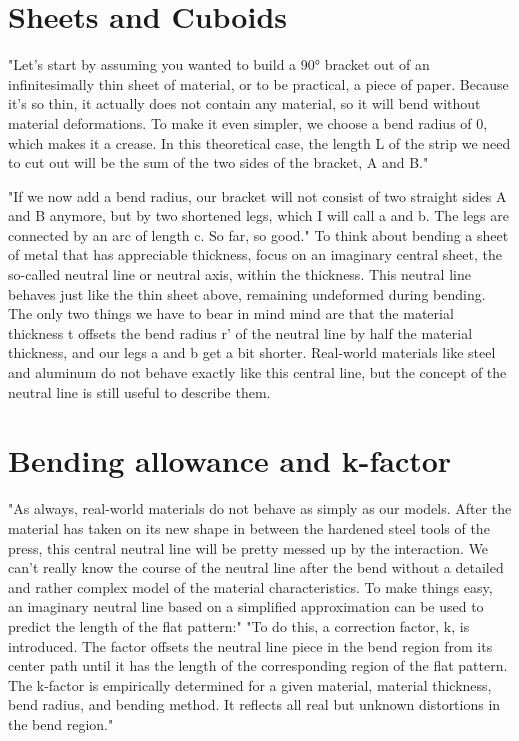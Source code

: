 \section{Sheets and Cuboids}
"Let’s start by assuming you wanted to build a 90° bracket out of an infinitesimally thin sheet of material, or to be practical, a piece of paper. Because it’s so thin, it actually does not contain any material, so it will bend without material deformations. To make it even simpler, we choose a bend radius of 0, which makes it a crease. In this theoretical case, the length L of the strip we need to cut out will be the sum of the two sides of the bracket, A and B."
\cite{by_artsciencebending_2016a} 

"If we now add a bend radius, our bracket will not consist of two straight sides A and B anymore, but by two shortened legs, which I will call a and b. The legs are connected by an arc of length c. So far, so good."
To think about bending a sheet of metal that has appreciable thickness, focus on an imaginary central sheet, the so-called neutral line or neutral axis, within the thickness. This neutral line behaves just like the thin sheet above, remaining undeformed during bending. The only two things we have to bear in mind mind are that the material thickness t offsets the bend radius r’ of the neutral line by half the material thickness, and our legs a and b get a bit shorter. Real-world materials like steel and aluminum do not behave exactly like this central line, but the concept of the neutral line is still useful to describe them.

\section{Bending allowance and k-factor}
"As always, real-world materials do not behave as simply as our models. After the material has taken on its new shape in between the hardened steel tools of the press, this central neutral line will be pretty messed up by the interaction. We can’t really know the course of the neutral line after the bend without a detailed and rather complex model of the material characteristics. To make things easy, an imaginary neutral line based on a simplified approximation can be used to predict the length of the flat pattern:"
"To do this, a correction factor, k, is introduced. The factor offsets the neutral line piece in the bend region from its center path until it has the length of the corresponding region of the flat pattern. The k-factor is empirically determined for a given material, material thickness, bend radius, and bending method. It reflects all real but unknown distortions in the bend region."

